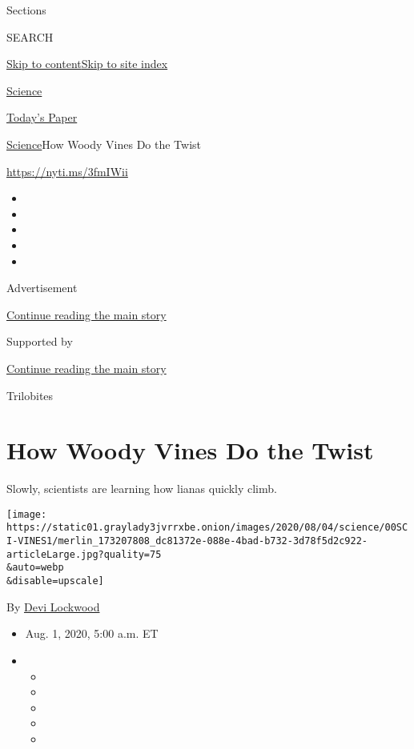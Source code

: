 Sections

SEARCH

\protect\hyperlink{site-content}{Skip to
content}\protect\hyperlink{site-index}{Skip to site index}

\href{https://www.nytimes3xbfgragh.onion/section/science}{Science}

\href{https://myaccount.nytimes3xbfgragh.onion/auth/login?response_type=cookie\&client_id=vi}{}

\href{https://www.nytimes3xbfgragh.onion/section/todayspaper}{Today's
Paper}

\href{/section/science}{Science}\textbar{}How Woody Vines Do the Twist

\url{https://nyti.ms/3fmIWii}

\begin{itemize}
\item
\item
\item
\item
\item
\end{itemize}

Advertisement

\protect\hyperlink{after-top}{Continue reading the main story}

Supported by

\protect\hyperlink{after-sponsor}{Continue reading the main story}

Trilobites

\hypertarget{how-woody-vines-do-the-twist}{%
\section{How Woody Vines Do the
Twist}\label{how-woody-vines-do-the-twist}}

Slowly, scientists are learning how lianas quickly climb.

\texttt{[image: https://static01.graylady3jvrrxbe.onion/images/2020/08/04/science/00SCI-VINES1/merlin\_173207808\_dc81372e-088e-4bad-b732-3d78f5d2c922-articleLarge.jpg?quality=75\\\&auto=webp\\\&disable=upscale]}

By \href{https://www.nytimes3xbfgragh.onion/by/devi-lockwood}{Devi
Lockwood}

\begin{itemize}
\item
  Aug. 1, 2020, 5:00 a.m. ET
\item
  \begin{itemize}
  \item
  \item
  \item
  \item
  \item
  \end{itemize}
\end{itemize}

